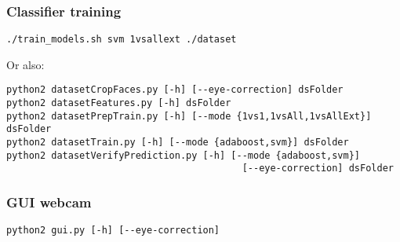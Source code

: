 \subsubsection*{Classifier training}

\begin{verbatim}
./train_models.sh svm 1vsallext ./dataset
\end{verbatim}

Or also:

\begin{verbatim}
python2 datasetCropFaces.py [-h] [--eye-correction] dsFolder
python2 datasetFeatures.py [-h] dsFolder
python2 datasetPrepTrain.py [-h] [--mode {1vs1,1vsAll,1vsAllExt}] dsFolder
python2 datasetTrain.py [-h] [--mode {adaboost,svm}] dsFolder
python2 datasetVerifyPrediction.py [-h] [--mode {adaboost,svm}]
                                          [--eye-correction] dsFolder
\end{verbatim}

\subsubsection*{GUI webcam}

\begin{verbatim}
python2 gui.py [-h] [--eye-correction]
\end{verbatim}

